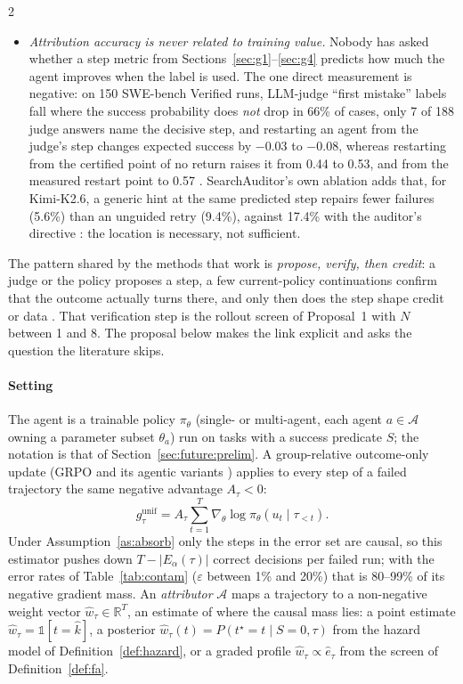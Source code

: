 \begin{multicols}{2}
\begin{itemize}[leftmargin=1.1em]
\item \emph{Attribution accuracy is never related to training value.} Nobody has asked whether a step metric from Sections~\ref{sec:g1}--\ref{sec:g4} predicts how much the agent improves when the label is used. The one direct measurement is negative: on 150 SWE-bench Verified runs, LLM-judge ``first mistake'' labels fall where the success probability does \emph{not} drop in 66\% of cases, only 7 of 188 judge answers name the decisive step, and restarting an agent from the judge's step changes expected success by $-0.03$ to $-0.08$, whereas restarting from the certified point of no return raises it from 0.44 to 0.53, and from the measured restart point to 0.57 \cite{shen2026epv}. SearchAuditor's own ablation adds that, for Kimi-K2.6, a generic hint at the same predicted step repairs fewer failures (5.6\%) than an unguided retry (9.4\%), against 17.4\% with the auditor's directive \cite{searchauditor2026}: the location is necessary, not sufficient.
\end{itemize}
The pattern shared by the methods that work is \emph{propose, verify, then credit}: a judge or the policy proposes a step, a few current-policy continuations confirm that the outcome actually turns there, and only then does the step shape credit or data \cite{liang2026elpo,jung2026prover,li2026cso,chu2026agentgrad}. That verification step is the rollout screen of Proposal~1 with $N$ between 1 and 8. The proposal below makes the link explicit and asks the question the literature skips.

\paragraph{Setting} The agent is a trainable policy $\pi_\theta$ (single- or multi-agent, each agent $a\in\mathcal{A}$ owning a parameter subset $\theta_a$) run on tasks with a success predicate $S$; the notation is that of Section~\ref{sec:future:prelim}. A group-relative outcome-only update (GRPO and its agentic variants \cite{feng2025gigpo}) applies to every step of a failed trajectory the same negative advantage $A_\tau<0$:
\[g^{\mathrm{unif}}_\tau=A_\tau\sum_{t=1}^{T}\nabla_\theta\log\pi_\theta(u_t\mid\tau_{<t}).\]
Under Assumption~\ref{as:absorb} only the steps in the error set are causal, so this estimator pushes down $T-|E_\alpha(\tau)|$ correct decisions per failed run; with the error rates of Table~\ref{tab:contam} ($\varepsilon$ between 1\% and 20\%) that is 80--99\% of its negative gradient mass. An \emph{attributor} $\mathcal{A}$ maps a trajectory to a non-negative weight vector $\hat w_\tau\in\mathbb{R}^T$, an estimate of where the causal mass lies: a point estimate $\hat w_\tau=\mathbb{1}[t=\hat k]$, a posterior $\hat w_\tau(t)=P(t^\star{=}t\mid S{=}0,\tau)$ from the hazard model of Definition~\ref{def:hazard}, or a graded profile $\hat w_\tau\propto\hat e_\tau$ from the screen of Definition~\ref{def:fa}.


\end{multicols}

